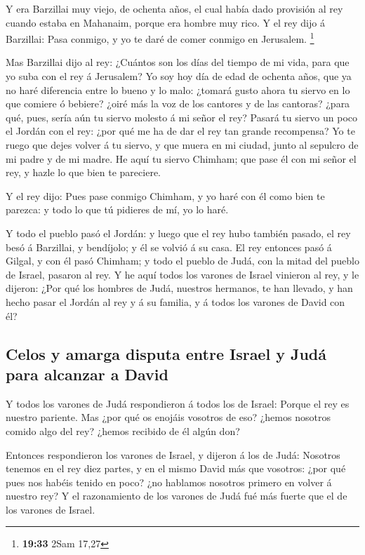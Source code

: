  Y era Barzillai muy viejo, de ochenta años, el cual
había dado provisión al rey cuando estaba en Mahanaim, porque era hombre
muy rico.  Y el rey dijo á Barzillai: Pasa conmigo, y yo
te daré de comer conmigo en Jerusalem. \footnote{\textbf{19:33} 2Sam
  17,27}

 Mas Barzillai dijo al rey: ¿Cuántos son los días del
tiempo de mi vida, para que yo suba con el rey á Jerusalem?
 Yo soy hoy día de edad de ochenta años, que ya no haré
diferencia entre lo bueno y lo malo: ¿tomará gusto ahora tu siervo en lo
que comiere ó bebiere? ¿oiré más la voz de los cantores y de las
cantoras? ¿para qué, pues, sería aún tu siervo molesto á mi señor el
rey?  Pasará tu siervo un poco el Jordán con el rey: ¿por
qué me ha de dar el rey tan grande recompensa?  Yo te
ruego que dejes volver á tu siervo, y que muera en mi ciudad, junto al
sepulcro de mi padre y de mi madre. He aquí tu siervo Chimham; que pase
él con mi señor el rey, y hazle lo que bien te pareciere.

 Y el rey dijo: Pues pase conmigo Chimham, y yo haré con
él como bien te parezca: y todo lo que tú pidieres de mí, yo lo haré.

 Y todo el pueblo pasó el Jordán: y luego que el rey hubo
también pasado, el rey besó á Barzillai, y bendíjolo; y él se volvió á
su casa.  El rey entonces pasó á Gilgal, y con él pasó
Chimham; y todo el pueblo de Judá, con la mitad del pueblo de Israel,
pasaron al rey.  Y he aquí todos los varones de Israel
vinieron al rey, y le dijeron: ¿Por qué los hombres de Judá, nuestros
hermanos, te han llevado, y han hecho pasar el Jordán al rey y á su
familia, y á todos los varones de David con él?

\hypertarget{celos-y-amarga-disputa-entre-israel-y-juduxe1-para-alcanzar-a-david}{%
\subsection{Celos y amarga disputa entre Israel y Judá para alcanzar a
David}\label{celos-y-amarga-disputa-entre-israel-y-juduxe1-para-alcanzar-a-david}}

 Y todos los varones de Judá respondieron á todos los de
Israel: Porque el rey es nuestro pariente. Mas ¿por qué os enojáis
vosotros de eso? ¿hemos nosotros comido algo del rey? ¿hemos recibido de
él algún don?

 Entonces respondieron los varones de Israel, y dijeron á
los de Judá: Nosotros tenemos en el rey diez partes, y en el mismo David
más que vosotros: ¿por qué pues nos habéis tenido en poco? ¿no hablamos
nosotros primero en volver á nuestro rey? Y el razonamiento de los
varones de Judá fué más fuerte que el de los varones de Israel.

